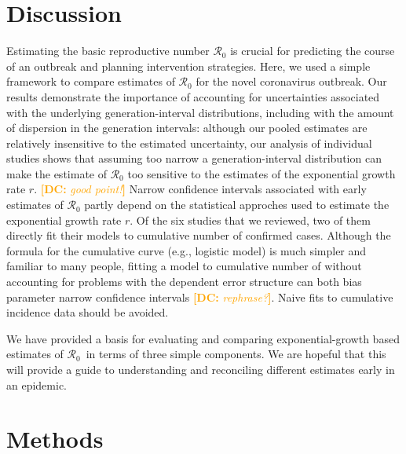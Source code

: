 \documentclass[12pt]{article}
\newcommand{\Rx}[1]{\ensuremath{{\mathcal R}_{#1}}}
\newcommand{\Ro}{\Rx{0}}
\newcommand{\comment}[3]{\textcolor{#1}{\textbf{[#2: }\textsl{#3}\textbf{]}}}
\newcommand{\dc}[1]{\comment{Orange}{DC}{#1}}
\begin{document}
\section{Discussion}

Estimating the basic reproductive number $\mathcal R_0$ is crucial for predicting the course of an outbreak and planning intervention strategies.
Here, we used a simple framework \citep{park2019practical} to compare estimates of $\mathcal R_0$ for the novel coronavirus outbreak.
Our results demonstrate the importance of accounting for uncertainties associated with the underlying generation-interval distributions, including with the amount of dispersion in the generation intervals:
although our pooled estimates are relatively insensitive to the estimated uncertainty, our analysis of individual studies shows that assuming too narrow a generation-interval distribution can make the estimate of $\mathcal R_0$ too sensitive to the estimates of the exponential growth rate $r$.
\dc{good point!}
Narrow confidence intervals associated with early estimates of $\mathcal R_0$ partly depend on the statistical approches used to estimate the exponential growth rate $r$.
Of the six studies that we reviewed, two of them directly fit their models to cumulative number of confirmed cases.
Although the formula for the cumulative curve (e.g., logistic model) is much simpler and familiar to many people, fitting a model to cumulative number of without accounting for problems with the dependent error structure can both bias parameter narrow confidence intervals \citep{ma2014estimating, king2015avoidable}\dc{rephrase?}.
Naive fits to cumulative incidence data should be avoided.

We have provided a basis for evaluating and comparing exponential-growth based estimates of \Ro\ in terms of three simple components. We are hopeful that this will provide a guide to understanding and reconciling different estimates early in an epidemic.

\section{Methods}
\end{document}
